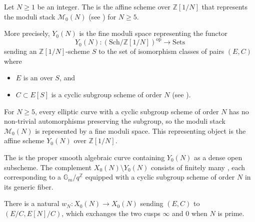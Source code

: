 \begin{definition} \label{definition:X_0_N_compactified_modular_curve_parameterizing_cyclic_N_isogenies_on_generalized_elliptic_curves}
Let $N \geq 1$ be an integer. The  is the affine scheme over $\mathbb{Z}[1/N]$ that represents the moduli stack $\mathcal{M}_0(N)$ (see ) for $N \geq 5$.

More precisely, $Y_0(N)$ is the fine moduli space representing the functor
\[
    Y_0(N): (\mathrm{Sch}/\mathbb{Z}[1/N])^{\mathrm{op}} \longrightarrow \mathrm{Sets}
\]
sending an $\mathbb{Z}[1/N]$-scheme $S$ to the set of isomorphism classes of pairs $(E, C)$ where
\begin{itemize}
    \item $E$ is an  over $S$, and
    \item $C \subset E[S]$ is a cyclic subgroup scheme of order $N$ (see ).
\end{itemize}

For $N \geq 5$, every elliptic curve with a cyclic subgroup scheme of order $N$ has no non-trivial automorphisms preserving the subgroup, so the moduli stack $\mathcal{M}_0(N)$ is represented by a fine moduli space. This representing object is the affine scheme $Y_0(N)$ over $\mathbb{Z}[1/N]$.

The  is the proper smooth algebraic curve containing $Y_0(N)$ as a dense open subscheme. The complement $X_0(N) \setminus Y_0(N)$ consists of finitely many , each corresponding to a  $\mathbb{G}_m/q^{\mathbb{Z}}$ equipped with a cyclic subgroup scheme of order $N$ in its generic fiber.

There is a natural  $w_N: X_0(N) \to X_0(N)$ sending $(E, C)$ to $(E/C, E[N]/C)$, which exchanges the two cusps $\infty$ and $0$ when $N$ is prime.
\end{definition}
